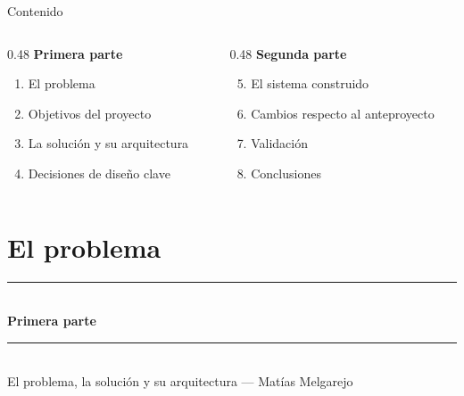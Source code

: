 \documentclass[11pt,aspectratio=169]{beamer}
\newcommand{\seccion}[2]{%
  \begin{frame}[plain]
    \vfill
    \begin{center}
      {\color{sigaAzul!30}\rule{0.5\textwidth}{1pt}}\\[10pt]
      {\LARGE\bfseries\color{sigaAzul}#1}\\[10pt]
      {\color{sigaAzul!30}\rule{0.5\textwidth}{1pt}}\\[14pt]
      {\small\color{sigaGris}#2}
    \end{center}
    \vfill
  \end{frame}%
}
\begin{document}
\begin{frame}{Contenido}
  \begin{columns}[T,onlytextwidth]
    \begin{column}{0.48\textwidth}
      {\color{sigaGris}\small\textbf{Primera parte}}\\[4pt]
      \begin{enumerate}
        \item El problema
        \item Objetivos del proyecto
        \item La solución y su arquitectura
        \item Decisiones de diseño clave
      \end{enumerate}
    \end{column}
    \begin{column}{0.48\textwidth}
      {\color{sigaGris}\small\textbf{Segunda parte}}\\[4pt]
      \begin{enumerate}
        \setcounter{enumi}{4}
        \item El sistema construido
        \item Cambios respecto al anteproyecto
        \item Validación
        \item Conclusiones
      \end{enumerate}
    \end{column}
  \end{columns}
\end{frame}

\section{El problema}
\seccion{Primera parte}{El problema, la solución y su arquitectura --- Matías Melgarejo}
\end{document}
